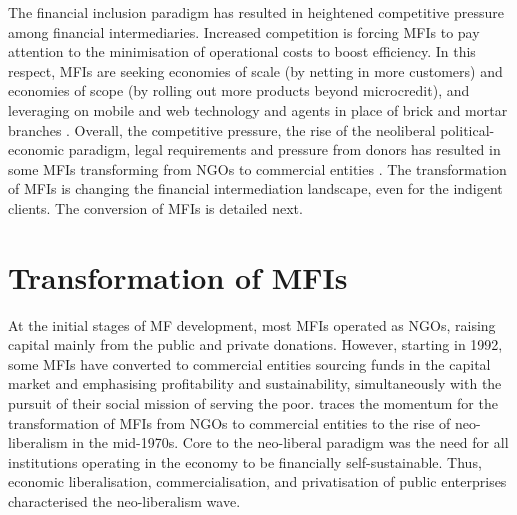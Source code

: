 \documentclass[a4paper, nobind]{templates/ociamthesis}
\begin{document}
The financial inclusion paradigm has resulted in heightened competitive pressure among financial intermediaries. Increased competition is forcing MFIs to pay attention to the minimisation of operational costs to boost efficiency. In this respect, MFIs are seeking economies of scale (by netting in more customers) and economies of scope (by rolling out more products beyond microcredit), and leveraging on mobile and web technology and agents in place of brick and mortar branches \autocite{muriu2016microfinance}. Overall, the competitive pressure, the rise of the neoliberal political-economic paradigm, legal requirements and pressure from donors has resulted in some MFIs transforming from NGOs to commercial entities \autocite{muriu2016microfinance,kar2016measuring}. The transformation of MFIs is changing the financial intermediation landscape, even for the indigent clients. The conversion of MFIs is detailed next.

\hypertarget{transformation-of-mfis}{%
\section{Transformation of MFIs}\label{transformation-of-mfis}}

\noindent At the initial stages of MF development, most MFIs operated as NGOs, raising capital mainly from the public and private donations. However, starting in 1992, some MFIs have converted to commercial entities sourcing funds in the capital market and emphasising profitability and sustainability, simultaneously with the pursuit of their social mission of serving the poor. \textcite{bateman2010doesn} traces the momentum for the transformation of MFIs from NGOs to commercial entities to the rise of neo-liberalism in the mid-1970s. Core to the neo-liberal paradigm was the need for all institutions operating in the economy to be financially self-sustainable. Thus, economic liberalisation, commercialisation, and privatisation of public enterprises characterised the neo-liberalism wave.
\end{document}
